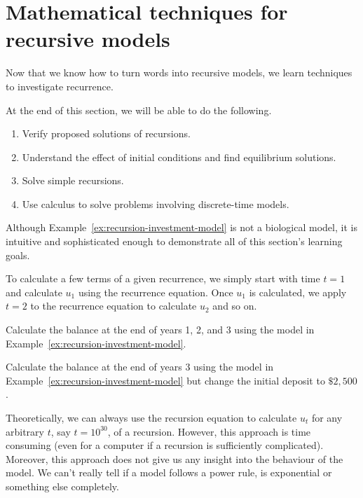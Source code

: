 \documentclass[../main.tex]{subfiles}
\begin{document}
 \section{Mathematical techniques for recursive models}

Now that we know how to turn words into recursive models, we learn techniques to investigate recurrence.

At the end of this section, we will be able to do the following.
\begin{enumerate}
  \item Verify proposed solutions of recursions.
  \item Understand the effect of initial conditions and find equilibrium solutions.
  \item Solve simple recursions.
  \item Use calculus to solve problems involving discrete-time models.
\end{enumerate}

\faLightbulb{} Although Example~\ref{ex:recursion-investment-model}  is not a biological model, it is intuitive and sophisticated enough to demonstrate all of this section's learning goals.

To calculate a few terms of a given recurrence, we simply start with time \(t=1\) and calculate \(u_{1}\) using the recurrence equation. Once \(u_{1}\) is calculated, we apply \(t = 2\) to the recurrence equation to calculate \(u_{2}\) and so on.
\begin{example} \label{ex:recurrence-bruteforce}
  Calculate the balance at the end of years 1, 2, and 3 using the model in Example~\ref{ex:recursion-investment-model}.

\end{example}

\begin{exercise} \label{ex:recurrence-equilibrium}
  Calculate the balance at the end of years \(3\) using the model in Example~\ref{ex:recursion-investment-model} but change the initial deposit to \(\$ 2,500\).

  \blanks*
\end{exercise}

\clearpage

Theoretically, we can always use the recursion equation to calculate \(u_{t}\) for any arbitrary \(t\), say \(t = 10^{30}\), of a recursion. However, this approach is time consuming (even for a computer if a recursion is sufficiently complicated). Moreover, this approach does not give us any insight into the behaviour of the model. We can't really tell if a model follows a power rule, is exponential or something else completely. 
\end{document}
